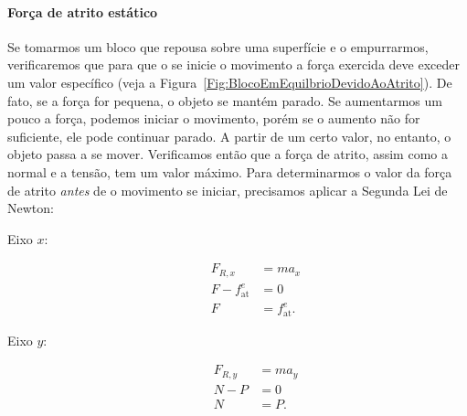 \paragraph{Força de atrito estático} 

Se tomarmos um bloco que repousa sobre uma superfície e o empurrarmos, verificaremos que para que o se inicie o movimento a força exercida deve exceder um valor específico (veja a Figura~\ref{Fig:BlocoEmEquilbrioDevidoAoAtrito}). De fato, se a força for pequena, o objeto se mantém parado. Se aumentarmos um pouco a força, podemos iniciar o movimento, porém se o aumento não for suficiente, ele pode continuar parado. A partir de um certo valor, no entanto, o objeto passa a se mover. Verificamos então que a força de atrito, assim como a normal e a tensão, tem um valor máximo. Para determinarmos o valor da força de atrito \emph{antes} de o movimento se iniciar, precisamos aplicar a Segunda Lei de Newton:
\begin{description}
    \item[Eixo $x$:]
        \begin{align}
            F_{R, x} &= m a_x \\
            F - f_{\text{at}}^e &= 0 \\
            F &= f_{\text{at}}^e.
        \end{align}
    \item[Eixo $y$:]
        \begin{align}
            F_{R, y} &= m a_y \\
            N - P &= 0 \\
            N &= P.
        \end{align}
\end{description}


